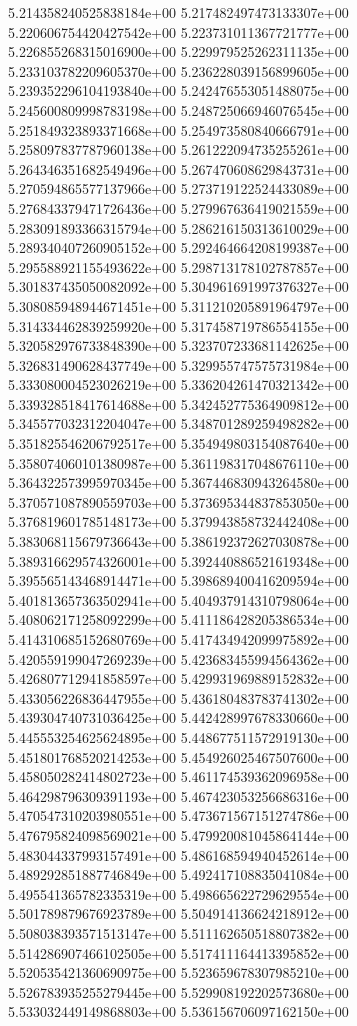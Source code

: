 5.214358240525838184e+00
5.217482497473133307e+00
5.220606754420427542e+00
5.223731011367721777e+00
5.226855268315016900e+00
5.229979525262311135e+00
5.233103782209605370e+00
5.236228039156899605e+00
5.239352296104193840e+00
5.242476553051488075e+00
5.245600809998783198e+00
5.248725066946076545e+00
5.251849323893371668e+00
5.254973580840666791e+00
5.258097837787960138e+00
5.261222094735255261e+00
5.264346351682549496e+00
5.267470608629843731e+00
5.270594865577137966e+00
5.273719122524433089e+00
5.276843379471726436e+00
5.279967636419021559e+00
5.283091893366315794e+00
5.286216150313610029e+00
5.289340407260905152e+00
5.292464664208199387e+00
5.295588921155493622e+00
5.298713178102787857e+00
5.301837435050082092e+00
5.304961691997376327e+00
5.308085948944671451e+00
5.311210205891964797e+00
5.314334462839259920e+00
5.317458719786554155e+00
5.320582976733848390e+00
5.323707233681142625e+00
5.326831490628437749e+00
5.329955747575731984e+00
5.333080004523026219e+00
5.336204261470321342e+00
5.339328518417614688e+00
5.342452775364909812e+00
5.345577032312204047e+00
5.348701289259498282e+00
5.351825546206792517e+00
5.354949803154087640e+00
5.358074060101380987e+00
5.361198317048676110e+00
5.364322573995970345e+00
5.367446830943264580e+00
5.370571087890559703e+00
5.373695344837853050e+00
5.376819601785148173e+00
5.379943858732442408e+00
5.383068115679736643e+00
5.386192372627030878e+00
5.389316629574326001e+00
5.392440886521619348e+00
5.395565143468914471e+00
5.398689400416209594e+00
5.401813657363502941e+00
5.404937914310798064e+00
5.408062171258092299e+00
5.411186428205386534e+00
5.414310685152680769e+00
5.417434942099975892e+00
5.420559199047269239e+00
5.423683455994564362e+00
5.426807712941858597e+00
5.429931969889152832e+00
5.433056226836447955e+00
5.436180483783741302e+00
5.439304740731036425e+00
5.442428997678330660e+00
5.445553254625624895e+00
5.448677511572919130e+00
5.451801768520214253e+00
5.454926025467507600e+00
5.458050282414802723e+00
5.461174539362096958e+00
5.464298796309391193e+00
5.467423053256686316e+00
5.470547310203980551e+00
5.473671567151274786e+00
5.476795824098569021e+00
5.479920081045864144e+00
5.483044337993157491e+00
5.486168594940452614e+00
5.489292851887746849e+00
5.492417108835041084e+00
5.495541365782335319e+00
5.498665622729629554e+00
5.501789879676923789e+00
5.504914136624218912e+00
5.508038393571513147e+00
5.511162650518807382e+00
5.514286907466102505e+00
5.517411164413395852e+00
5.520535421360690975e+00
5.523659678307985210e+00
5.526783935255279445e+00
5.529908192202573680e+00
5.533032449149868803e+00
5.536156706097162150e+00
